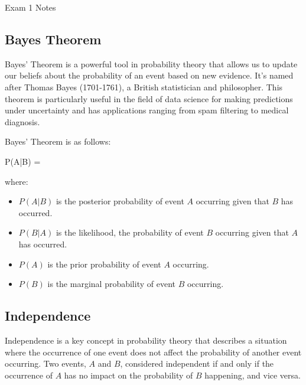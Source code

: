 \begin{examnotes}{Exam 1 Notes}
    \subsection*{Bayes Theorem}

    Bayes' Theorem is a powerful tool in probability theory that allows us to update our beliefs about the probability of an event based on new evidence. It's named after Thomas Bayes (1701-1761), a 
    British statistician and philosopher. This theorem is particularly useful in the field of data science for making predictions under uncertainty and has applications ranging from spam filtering 
    to medical diagnosis.

    Bayes' Theorem is as follows:
    \begin{center}
        \begin{highlightbox}
            P(A|B) = 
        \end{highlightbox}
    \end{center}
    where:
    \begin{itemize}
        \item $P(A|B)$ is the posterior probability of event $A$ occurring given that $B$ has occurred.
        \item $P(B|A)$ is the likelihood, the probability of event $B$ occurring given that $A$ has occurred.
        \item $P(A)$ is the prior probability of event $A$ occurring.
        \item $P(B)$ is the marginal probability of event $B$ occurring.
    \end{itemize}

    \subsection*{Independence}

    Independence is a key concept in probability theory that describes a situation where the occurrence of one event does not affect the probability of another event occurring. Two events, $A$ and $B$,
    considered independent if and only if the occurrence of $A$ has no impact on the probability of $B$ happening, and vice versa.


\end{examnotes}
